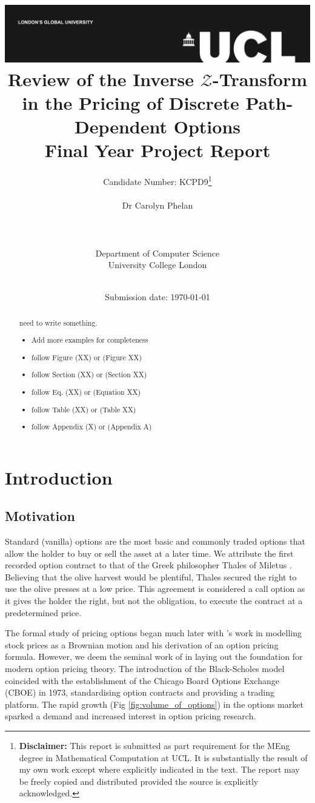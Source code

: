 \documentclass[a4paper]{report}
\title{{\vspace{-14em} \includegraphics[scale=0.4]{Logos/ucl_logo.png}}\\
{{\vspace{2em} \Huge Review of the Inverse $\mathcal{Z}$-Transform in the Pricing of Discrete Path-Dependent Options}}\\
{\large Final Year Project Report}\\
}
\date{Submission date: \today}
\author{Candidate Number: KCPD9\thanks{
{\bf Disclaimer:}
This report is submitted as part requirement for the MEng degree in Mathematical Computation at UCL. It is substantially the result of my own work except where explicitly indicated in the text. The report may be freely copied and distributed provided the source is explicitly acknowledged.}
\\ \\ Dr Carolyn Phelan
\\ \\ \\ \\ Department of Computer Science
\\ University College London
\\ \\
}
\begin{document}
\onehalfspacing
\maketitle

\renewcommand{\abstractname}{Acknowledgements}
\begin{abstract}
need to write something.
\end{abstract}

\renewcommand{\abstractname}{Abstract}
\begin{abstract}
\begin{itemize}
\item Add more examples for completeness
\item follow Figure (XX) or (Figure XX)	
\item follow Section (XX) or (Section XX)
\item follow Eq. (XX) or (Equation XX)
\item follow Table (XX) or (Table XX)
\item follow Appendix (X) or (Appendix A)
\end{itemize}

\end{abstract}

\tableofcontents
\setcounter{page}{1}

\chapter{Introduction}
\section{Motivation}
Standard (vanilla) options are the most basic and commonly traded options that allow the holder to buy or sell the asset at a later time. We attribute the first recorded option contract to that of the Greek philosopher Thales of Miletus \citep{thompson1994aristotle}. Believing that the olive harvest would be plentiful, Thales secured the right to use the olive presses at a low price. This agreement is considered a call option as it gives the holder the right, but not the obligation, to execute the contract at a predetermined price.

The formal study of pricing options began much later with \citet{bachelier1900theorie}'s work in modelling stock prices as a Brownian motion and his derivation of an option pricing formula. However, we deem the seminal work of \citet{black1973pricing} in laying out the foundation for modern option pricing theory. The introduction of the Black-Scholes model coincided with the establishment of the Chicago Board Options Exchange (CBOE) in 1973, standardising option contracts and providing a trading platform. The rapid growth (Fig \ref{fig:volume_of_options}) in the options market sparked a demand and increased interest in option pricing research.
\end{document}

